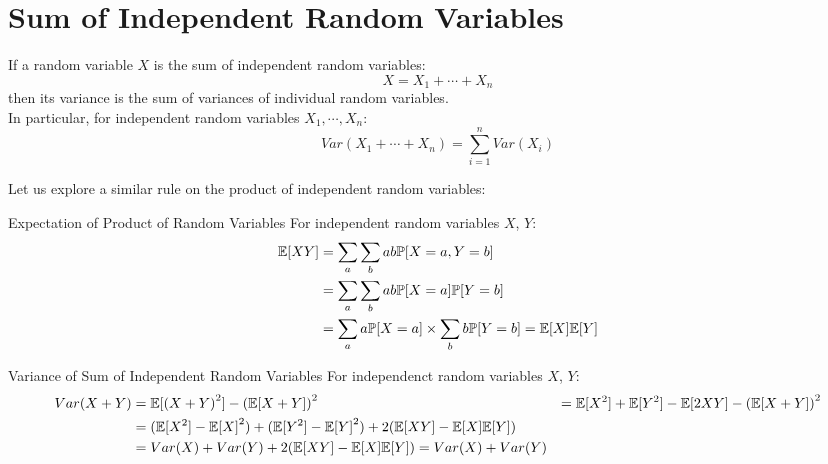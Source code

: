 \section{Sum of Independent Random Variables}
If a random variable $X$ is the sum of independent random variables:
\[X = X_1 + \cdots + X_n\]
then its variance is the sum of variances of individual random variables. \\
In particular, for independent random variables $X_1, \cdots, X_n$:
\[Var(X_1 + \cdots + X_n) = \sum_{i = 1}^n Var(X_i)\]

Let us explore a similar rule on the product of independent random variables:
\begin{ln-theorem}{Expectation of Product of Random Variables}{}
    For independent random variables $X$, $Y$:
    \begin{align*}
        \mathbb{E}[XY] &= \sum_a \sum_b ab \mathbb{P}[X = a, Y = b] \\
        &= \sum_a \sum_b ab \mathbb{P}[X = a] \mathbb{P}[Y = b] \\
        &= \sum_a a \mathbb{P}[X = a] \times \sum_b b \mathbb{P}[Y = b] = \mathbb{E}[X] \mathbb{E}[Y]
    \end{align*}
\end{ln-theorem}
\begin{ln-theorem}{Variance of Sum of Independent Random Variables}{}
    For independenct random variables $X$, $Y$:
    \begin{align*}
        Var(X + Y)
        &= \mathbb{E}[{(X + Y)}^2] - {(\mathbb{E}[X + Y])}^2
        &= \mathbb{E}[X^2] + \mathbb{E}[Y^2] - \mathbb{E}[2XY] - {(\mathbb{E}[X + Y])}^2 \\
        &= (\mathbb{E}[X^2] - {\mathbb{E}[X]}^2) + (\mathbb{E}[Y^2] - {\mathbb{E}[Y]}^2) + 2(\mathbb{E}[XY] - \mathbb{E}[X]\mathbb{E}[Y]) \\
        &= Var(X) + Var(Y) + 2(\mathbb{E}[XY] - \mathbb{E}[X]\mathbb{E}[Y]) = Var(X) + Var(Y)
    \end{align*}
\end{ln-theorem}

